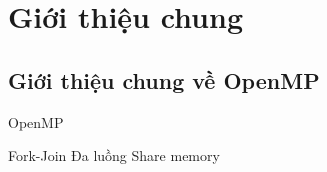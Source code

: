 \newpage
\section{Giới thiệu chung}
\subsection{Giới thiệu chung về OpenMP}

OpenMP

Fork-Join
Đa luồng 
Share memory












